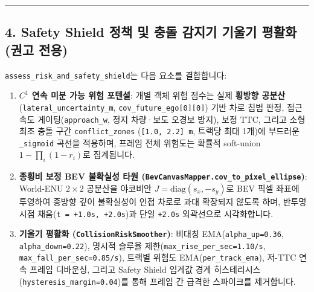 \documentclass[10.5pt,a4paper]{article}
\begin{document}
\par\noindent\rule{\textwidth}{0.4pt}\par\medskip

\subsection{4. Safety Shield 정책 및 충돌 감지기 기울기 평활화 (권고 전용)}

\texttt{assess\_\allowbreak{}risk\_\allowbreak{}and\_\allowbreak{}safety\_\allowbreak{}shield}는 다음 요소를 결합합니다:

\begin{enumerate}[leftmargin=1.8em,itemsep=2pt]
\item \textbf{$C^1$ 연속 미분 가능 위험 포텐셜}: 개별 객체 위험 점수는 실제 \textbf{횡방향 공분산}(\texttt{lateral\_\allowbreak{}uncertainty\_\allowbreak{}m}, \texttt{cov\_\allowbreak{}future\_\allowbreak{}ego[0][0]}) 기반 차로 침범 판정, 접근 속도 게이팅(\texttt{approach\_\allowbreak{}w}, 정지 차량·보도 오경보 방지), 보정 TTC, 그리고 소형 최조 충돌 구간 \texttt{conflict\_\allowbreak{}zones} (\texttt{[1.\allowbreak{}0,\allowbreak{} 2.\allowbreak{}2] m}, 트랙당 최대 1개)에 부드러운 \texttt{\_\allowbreak{}sigmoid} 곡선을 적용하며, 프레임 전체 위험도는 확률적 soft-union $1 - \prod_i (1 - r_i)$로 집계됩니다.
\item \textbf{종횡비 보정 BEV 불확실성 타원 (\texttt{BevCanvasMapper.\allowbreak{}cov\_\allowbreak{}to\_\allowbreak{}pixel\_\allowbreak{}ellipse})}: World-ENU $2\times 2$ 공분산을 야코비안 $J = \text{diag}(s_x, -s_y)$로 BEV 픽셀 좌표에 투영하여 종방향 깊이 불확실성이 인접 차로로 과대 확장되지 않도록 하며, 반투명 시점 채움(\texttt{t = +1.\allowbreak{}0s,\allowbreak{} +2.\allowbreak{}0s})과 단일 \texttt{+2.\allowbreak{}0s} 외곽선으로 시각화합니다.
\item \textbf{기울기 평활화 (\texttt{CollisionRiskSmoother})}: 비대칭 EMA(\texttt{alpha\_\allowbreak{}up=0.\allowbreak{}36}, \texttt{alpha\_\allowbreak{}down=0.\allowbreak{}22}), 명시적 슬루율 제한(\texttt{max\_\allowbreak{}rise\_\allowbreak{}per\_\allowbreak{}sec=1.\allowbreak{}10/\allowbreak{}s}, \texttt{max\_\allowbreak{}fall\_\allowbreak{}per\_\allowbreak{}sec=0.\allowbreak{}85/\allowbreak{}s}), 트랙별 위험도 EMA(\texttt{per\_\allowbreak{}track\_\allowbreak{}ema}), 저-TTC 연속 프레임 디바운싱, 그리고 Safety Shield 임계값 경계 히스테리시스(\texttt{hysteresis\_\allowbreak{}margin=0.\allowbreak{}04})를 통해 프레임 간 급격한 스파이크를 제거합니다.
\end{enumerate}
\end{document}
